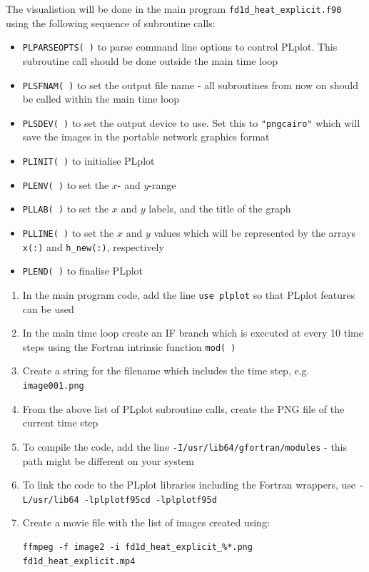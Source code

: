 \documentclass[12pt]{article}
\begin{document}
\begin{enumerate}
The visualistion will be done in the main program \texttt{fd1d\_heat\_explicit.f90} using the
following sequence of subroutine calls:
\begin{itemize}
\item\texttt{PLPARSEOPTS( )} to parse command line options to control PLplot. This subroutine
call should be done outside the main time loop
\item\texttt{PLSFNAM( )} to set the output file name - all subroutines from now on should be
called within the main time loop
\item\texttt{PLSDEV( )} to set the output device to use. Set this to \texttt{"pngcairo"} which
will save the images in the portable network graphics format
\item\texttt{PLINIT( )} to initialise PLplot
\item\texttt{PLENV( )} to set the $x$- and $y$-range
\item\texttt{PLLAB( )} to set the $x$ and $y$ labels, and the title of the graph
\item\texttt{PLLINE( )} to set the $x$ and $y$ values which will be represented by the
  arrays \texttt{x(:)} and \texttt{h\_new(:)}, respectively
\item\texttt{PLEND( )} to finalise PLplot
\end{itemize}  
\begin{enumerate}
\item In the main program code, add the line \texttt{use plplot} so that PLplot features can be
used
\item In the main time loop create an IF branch which is executed at every 10 time steps
using the Fortran intrinsic function \texttt{mod( )}
\item Create a string for the filename which includes the time step, e.g. 
\texttt{image001.png}
\item From the above list of PLplot subroutine calls, create the PNG file of the
current time step
\item To compile the code, add the line \texttt{-I/usr/lib64/gfortran/modules} - this
  path might be different on your system
\item To link the code to the PLplot libraries including the Fortran wrappers, use \newline
\texttt{-L/usr/lib64 -lplplotf95cd -lplplotf95d}
\item Create a movie file with the list of images created using:
\begin{verbatim}
ffmpeg -f image2 -i fd1d_heat_explicit_%*.png fd1d_heat_explicit.mp4

\end{verbatim}
\end{enumerate}
\end{enumerate}
\end{document}
